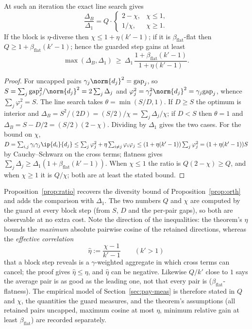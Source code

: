 \begin{proposition}\label{prop:ratio}
At such an iteration the exact line search gives
\[
\frac{\Delta_B}{\Delta_1}=Q\cdot\begin{cases}2-\chi,&\chi\le1,\\
1/\chi,&\chi\ge1.\end{cases}
\]
If the block is $\eta$-diverse then $\chi\le1+\eta(k'-1)$; if it is
$\beta_{\mathrm{flat}}$-flat then $Q\ge1+\beta_{\mathrm{flat}}(k'-1)$; hence the guarded step gains at
least
\[
\max(\Delta_B,\Delta_1)\ \ge\ \Delta_1\,\frac{1+\beta_{\mathrm{flat}}(k'-1)}{1+\eta(k'-1)} .
\]
\end{proposition}
\begin{proof}
For uncapped pairs $\gamma_j\norm{d_j}^2=\mathrm{gap}_j$, so
$S=\sum_j\mathrm{gap}_j^2/\norm{d_j}^2=2\sum_j\Delta_j$ and
$\varphi_j^2=\gamma_j^2\norm{d_j}^2=\gamma_j\mathrm{gap}_j$, whence
$\sum_j\varphi_j^2=S$. The line search takes $\theta=\min(S/D,1)$. If $D\ge S$
the optimum is interior and $\Delta_B=S^2/(2D)=(S/2)/\chi=\sum_j\Delta_j/\chi$;
if $D<S$ then $\theta=1$ and $\Delta_B=S-D/2=(S/2)(2-\chi)$. Dividing
by $\Delta_1$ gives the two cases. For the bound on $\chi$,
$D=\sum_{i,j}\gamma_i\gamma_j\ip{d_i}{d_j}\le\sum_j\varphi_j^2+\eta\sum_{i\ne j}\varphi_i\varphi_j
\le(1+\eta(k'-1))\sum_j\varphi_j^2=(1+\eta(k'-1))S$ by Cauchy--Schwarz on the
cross terms; flatness gives $\sum_j\Delta_j\ge\Delta_1(1+\beta_{\mathrm{flat}}(k'-1))$.
When $\chi\le1$ the ratio is $Q(2-\chi)\ge Q$, and when $\chi\ge1$
it is $Q/\chi$; both are at least the stated bound.
\end{proof}
Proposition~\ref{prop:ratio} recovers the diversity bound of Proposition~\ref{prop:orth} and adds the comparison with $\Delta_1$. The two
numbers $Q$ and $\chi$ are computed by the guard at every block step
(from $S$, $D$ and the per-pair gaps), so both are observable at no
extra cost. Note the direction of the inequalities: the theorem's $\eta$
bounds the \emph{maximum} absolute pairwise cosine of the retained
directions, whereas the \emph{effective correlation}
\[
\hat\eta:=\frac{\chi-1}{k'-1}\qquad(k'>1)
\]
that a block step reveals is a $\gamma$-weighted aggregate in which
cross terms can cancel; the proof gives $\hat\eta\le\eta$, and $\hat\eta$
can be negative. Likewise $Q/k'$ close to $1$ says the average pair is
as good as the leading one, not that every pair is ($\beta_{\mathrm{flat}}$-flatness).
The empirical model of Section~\ref{sec:pay-meas} is therefore stated in
$Q$ and $\chi$, the quantities the guard measures, and the theorem's
assumptions (all retained pairs uncapped, maximum cosine at most $\eta$,
minimum relative gain at least $\beta_{\mathrm{flat}}$) are recorded separately.


